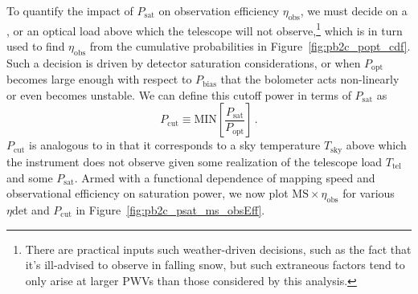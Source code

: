 To quantify the impact of $P_{\mathrm{sat}}$ on observation efficiency $\eta_{\mathrm{obs}}$, we must decide on a , or an optical load above which the telescope will not observe,\footnote{There are practical inputs such weather-driven decisions, such as the fact that it's ill-advised to observe in falling snow, but such extraneous factors tend to only arise at larger PWVs than those considered by this analysis.} which is in turn used to find $\eta_{\mathrm{obs}}$ from the cumulative probabilities in Figure~\ref{fig:pb2c_popt_cdf}. Such a decision is driven by detector saturation considerations, or when $P_{\mathrm{opt}}$ becomes large enough with respect to $P_{\mathrm{bias}}$ that the bolometer acts non-linearly or even becomes unstable. We can define this cutoff power in terms of $P_{\mathrm{sat}}$ as
\begin{equation}
    P_{\mathrm{cut}} \equiv \mathrm{MIN}\left[ \frac{P_{\mathrm{sat}}}{P_{\mathrm{opt}}} \right] \, .
    \label{eq:psat_cutoff}
\end{equation}
$P_{\mathrm{cut}}$ is analogous to  in that it corresponds to a sky temperature $T_{\mathrm{sky}}$ above which the instrument does not observe given some realization of the telescope load $T_{\mathrm{tel}}$ and some $P_{\mathrm{sat}}$. 
Armed with a functional dependence of mapping speed and observational efficiency on saturation power, we now plot $\mathrm{MS} \times \eta_{\mathrm{obs}}$ for various $\eta{\mathrm{det}}$ and $P_{\mathrm{cut}}$ in Figure~\ref{fig:pb2c_psat_ms_obsEff}.

